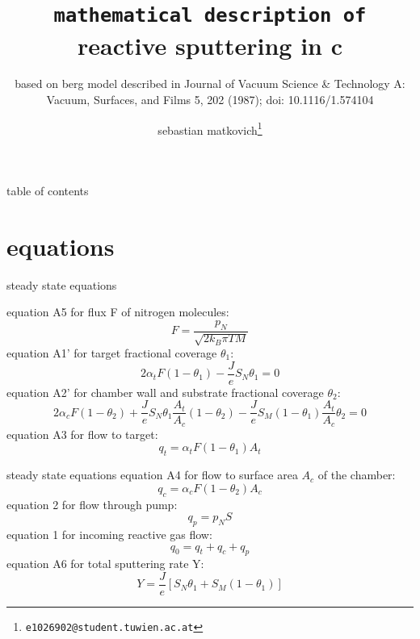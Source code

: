\documentclass{beamer}
\title{\texttt{mathematical description of} reactive sputtering in c}
\subtitle{based on berg model described in Journal of Vacuum Science \& Technology A: Vacuum, Surfaces, and Films 5, 202 (1987); doi:
10.1116/1.574104}
\author{sebastian matkovich\footnote{\texttt{e1026902@student.tuwien.ac.at}}}
\begin{document}
\begin{frame}
  \maketitle
\end{frame}

\begin{frame}{table of contents}
  \tableofcontents
\end{frame}

\section{equations}

\begin{frame}{steady state equations}


equation A5 for flux F of nitrogen molecules:
	  \begin{equation} F=\frac{p_{N}}{\sqrt{2k_{B}\pi TM}}  \end{equation}
equation A1' for target fractional coverage $\theta_{1}$:
	  \begin{equation} 2\alpha_{t}F(1-\theta_{1})-\frac{J}{e}S_{N}\theta_{1}=0  \end{equation}
equation A2' for chamber wall and substrate fractional coverage $\theta_{2}$:
	  \begin{equation} 2\alpha_{c}F(1-\theta_{2})+\frac{J}{e}S_{N}\theta_{1}\frac{A_{t}}{A_{c}}(1-\theta_{2})-\frac{J}{e}S_{M}(1-\theta_{1})\frac{A_{t}}{A_{c}}\theta_{2}=0 \end{equation}
equation A3 for flow to target:
	  \begin{equation} q_{t}=\alpha_{t}F(1-\theta_{1})A_{t}  \end{equation}
\end{frame}
\begin{frame}{steady state equations}
equation A4 for flow to surface area $A_{c}$ of the chamber:
	  \begin{equation} q_{c}=\alpha_{c}F(1-\theta_{2})A_{c}  \end{equation}
equation 2 for flow through pump:
		  \begin{equation} q_{p}=p_{N}S  \end{equation}
equation 1 for incoming reactive gas flow:
	  \begin{equation} q_{0}=q_{t}+q_{c}+q_{p}  \end{equation}
equation A6 for total sputtering rate Y:
	\begin{equation} Y=\frac{J}{e}[S_{N}\theta_{1}+S_{M}(1-\theta_{1})] \end{equation}

\end{frame}
\end{document}
